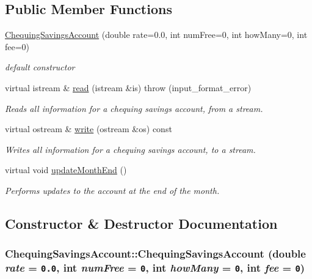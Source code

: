 \subsection*{Public Member Functions}
\begin{CompactItemize}
\item 
\hyperlink{classChequingSavingsAccount_97bbf69acfaedb5e8442528b24f10480}{ChequingSavingsAccount} (double rate=0.0, int numFree=0, int howMany=0, int fee=0)
\begin{CompactList}\small\item\em default constructor \item\end{CompactList}\item 
virtual istream \& \hyperlink{classChequingSavingsAccount_c0de0e2d3ac55227f31a4715ae257646}{read} (istream \&is)  throw (input\_\-format\_\-error)
\begin{CompactList}\small\item\em Reads all information for a chequing savings account, from a stream. \item\end{CompactList}\item 
virtual ostream \& \hyperlink{classChequingSavingsAccount_61888979bbaf273b2c20f92d2f41f226}{write} (ostream \&os) const 
\begin{CompactList}\small\item\em Writes all information for a chequing savings account, to a stream. \item\end{CompactList}\item 
virtual void \hyperlink{classChequingSavingsAccount_0bbd0c3b03b968fc2f80eb2a4fffa3f2}{updateMonthEnd} ()
\begin{CompactList}\small\item\em Performs updates to the account at the end of the month. \item\end{CompactList}\end{CompactItemize}


\subsection{Constructor \& Destructor Documentation}
\hypertarget{classChequingSavingsAccount_97bbf69acfaedb5e8442528b24f10480}{
\subsubsection[ChequingSavingsAccount]{\setlength{\rightskip}{0pt plus 5cm}ChequingSavingsAccount::ChequingSavingsAccount (double {\em rate} = {\tt 0.0}, \/  int {\em numFree} = {\tt 0}, \/  int {\em howMany} = {\tt 0}, \/  int {\em fee} = {\tt 0})}}
\label{classChequingSavingsAccount_97bbf69acfaedb5e8442528b24f10480}


